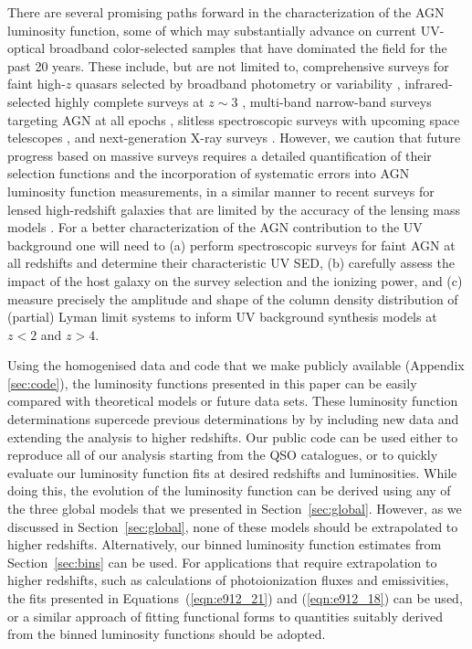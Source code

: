\documentclass[fleqn,usenatbib]{mnras}
\begin{document}
There are several promising paths forward in the characterization of
the AGN luminosity function, some of which may substantially advance
on current UV-optical broadband color-selected samples that have
dominated the field for the past 20 years.  These include, but are not
limited to, comprehensive surveys for faint high-$z$ quasars selected
by broadband photometry \citep{2016ApJ...828...26M,
  2017ApJ...839...27W} or variability \citep{2017MNRAS.464.1693H},
infrared-selected highly complete surveys at $z\sim 3$
\citep{2017ApJ...851...13S, 2018AJ....155..110Y}, multi-band
narrow-band surveys targeting AGN at all epochs
\citep{2014arXiv1403.5237B}, slitless spectroscopic surveys with
upcoming space telescopes \citep{2011arXiv1110.3193L,
  2013arXiv1305.5422S}, and next-generation X-ray surveys
\citep[e.g.][]{2013A&A...558A..89K}. However, we caution that future
progress based on massive surveys requires a detailed quantification
of their selection functions and the incorporation of systematic
errors into AGN luminosity function measurements, in a similar manner
to recent surveys for lensed high-redshift galaxies that are limited
by the accuracy of the lensing mass models \citep{2017ApJ...843..129B,
  2018ApJ...854...73I, 2018arXiv180309747A}.  For a better
characterization of the AGN contribution to the UV background one will
need to (a) perform spectroscopic surveys for faint AGN at all
redshifts and determine their characteristic UV SED, (b) carefully
assess the impact of the host galaxy on the survey selection and the
ionizing power, and (c) measure precisely the amplitude and shape of
the column density distribution of (partial)  Lyman limit
systems to inform UV background synthesis models at $z<2$ and $z>4$.

Using the homogenised data and code that we make publicly available
(Appendix \ref{sec:code}), the luminosity functions presented in this
paper can be easily compared with theoretical models or future data
sets.  These luminosity function determinations supercede previous
determinations by \citet{2007ApJ...654..731H} by including new data
and extending the analysis to higher redshifts.  Our public code can
be used either to reproduce all of our analysis starting from the QSO
catalogues, or to quickly evaluate our luminosity function fits at
desired redshifts and luminosities.  While doing this, the evolution
of the luminosity function can be derived using any of the three
global models that we presented in Section~\ref{sec:global}.  However,
as we discussed in Section~\ref{sec:global}, none of these models
should be extrapolated to higher redshifts.  Alternatively, our binned
luminosity function estimates from Section~\ref{sec:bins} can be used.
For applications that require extrapolation to higher redshifts, such
as calculations of photoionization fluxes and emissivities, the fits
presented in Equations~(\ref{eqn:e912_21}) and (\ref{eqn:e912_18}) can
be used, or a similar approach of fitting functional forms to
quantities suitably derived from the binned luminosity functions
should be adopted.
\end{document}
